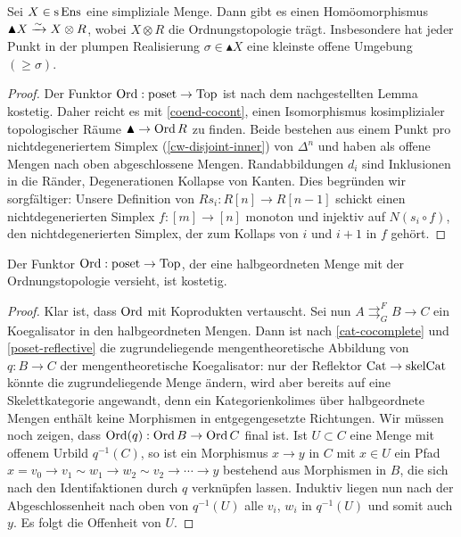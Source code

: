 \begin{prop}
  Sei $X \in \operatorname{s}\operatorname{Ens}$ eine simpliziale Menge. Dann gibt es einen
  Homöomorphismus $\blacktriangle X \xrightarrow[]{\sim} X \otimes R$, wobei $X
  \otimes R$ die Ordnungstopologie trägt. Insbesondere hat jeder Punkt
  in der plumpen Realisierung $\sigma \in \blacktriangle X$ eine
  kleinste offene Umgebung $(\geq \sigma)$.
\end{prop}
\begin{proof}
  Der Funktor $\operatorname{Ord}: \operatorname{poset} \to \operatorname{Top}$ ist nach dem nachgestellten
  Lemma kostetig. Daher reicht es mit \ref{coend-cocont}, einen
  Isomorphismus kosimplizialer topologischer Räume $\blacktriangle \to
  \operatorname{Ord} R$ zu finden. Beide bestehen aus einem Punkt pro
  nichtdegeneriertem Simplex (\ref{cw-disjoint-inner}) von $\Delta^n$
  und haben als offene Mengen nach oben abgeschlossene
  Mengen. Randabbildungen $d_i$ sind Inklusionen in die Ränder,
  Degenerationen Kollapse von Kanten. Dies begründen wir sorgfältiger:
  Unsere Definition von $Rs_i: R[n] \to R[n-1]$ schickt einen
  nichtdegenerierten Simplex $f: [m] \to [n]$ monoton und injektiv auf
  $N(s_i \circ f)$, den nichtdegenerierten Simplex, der zum Kollaps
  von $i$ und $i+1$ in $f$ gehört.
\end{proof}
\begin{lemma}
  Der Funktor $\operatorname{Ord}: \operatorname{poset} \to \operatorname{Top}$, der eine halbgeordneten Menge
  mit der Ordnungstopologie versieht, ist kostetig.
\end{lemma}
\begin{proof}
    Klar ist, dass $\operatorname{Ord}$ mit Koprodukten vertauscht. Sei nun $A
    \mathrel{\mathop{\rightrightarrows}^{F}_{G}} B \to C$ ein
    Koegalisator in den halbgeordneten Mengen. Dann ist nach
    \ref{cat-cocomplete} und \ref{poset-reflective} die
    zugrundeliegende mengentheoretische Abbildung von $q: B \to C$ der
    mengentheoretische Koegalisator: nur der Reflektor $\operatorname{Cat} \to
    \mathrm{skelCat}$ könnte die zugrundeliegende Menge ändern, wird
    aber bereits auf eine Skelettkategorie angewandt, denn ein
    Kategorienkolimes über halbgeordnete Mengen enthält keine
    Morphismen in entgegengesetzte Richtungen. Wir müssen noch zeigen,
    dass $\operatorname{Ord}(q): \operatorname{Ord} B \to \operatorname{Ord} C$ final ist. Ist $U \subset C$
    eine Menge mit offenem Urbild $q^{-1}(C)$, so ist ein Morphismus
    $x \to y$ in $C$ mit $x \in U$ ein Pfad $x = v_0 \to v_1 \sim w_1
    \to w_2 \sim v_2 \to \cdots \to y$ bestehend aus Morphismen in
    $B$, die sich nach den Identifaktionen durch $q$ verknüpfen
    lassen. Induktiv liegen nun nach der Abgeschlossenheit nach oben
    von $q^{-1}(U)$ alle $v_i$, $w_i$ in $q^{-1}(U)$ und somit auch
    $y$. Es folgt die Offenheit von $U$.
\end{proof}

